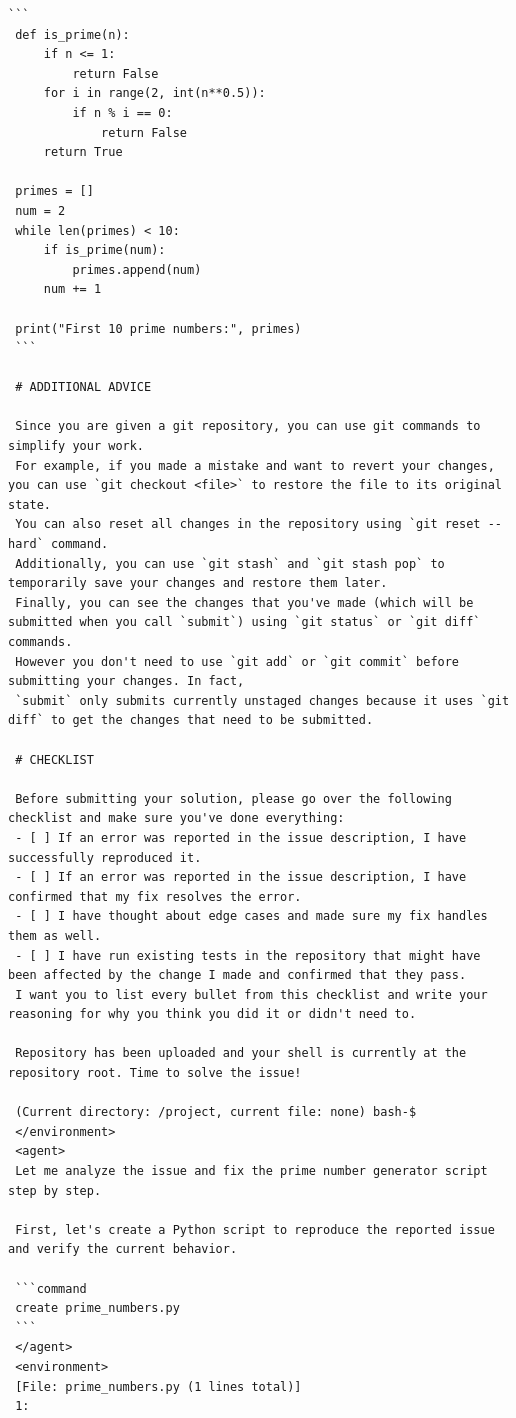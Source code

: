 \documentclass[dandb]{article}
\begin{document}
\begin{lstlisting}[upquote=true,caption=System prompt for LLM evaluation runs on SWE-rebench leaderboard tasks]
 ```
 def is_prime(n):
     if n <= 1:
         return False
     for i in range(2, int(n**0.5)):
         if n % i == 0:
             return False
     return True

 primes = []
 num = 2
 while len(primes) < 10:
     if is_prime(num):
         primes.append(num)
     num += 1

 print("First 10 prime numbers:", primes)
 ```

 # ADDITIONAL ADVICE

 Since you are given a git repository, you can use git commands to simplify your work.
 For example, if you made a mistake and want to revert your changes, you can use `git checkout <file>` to restore the file to its original state.
 You can also reset all changes in the repository using `git reset --hard` command.
 Additionally, you can use `git stash` and `git stash pop` to temporarily save your changes and restore them later.
 Finally, you can see the changes that you've made (which will be submitted when you call `submit`) using `git status` or `git diff` commands.
 However you don't need to use `git add` or `git commit` before submitting your changes. In fact,
 `submit` only submits currently unstaged changes because it uses `git diff` to get the changes that need to be submitted.

 # CHECKLIST

 Before submitting your solution, please go over the following checklist and make sure you've done everything:
 - [ ] If an error was reported in the issue description, I have successfully reproduced it.
 - [ ] If an error was reported in the issue description, I have confirmed that my fix resolves the error.
 - [ ] I have thought about edge cases and made sure my fix handles them as well.
 - [ ] I have run existing tests in the repository that might have been affected by the change I made and confirmed that they pass.
 I want you to list every bullet from this checklist and write your reasoning for why you think you did it or didn't need to.

 Repository has been uploaded and your shell is currently at the repository root. Time to solve the issue!

 (Current directory: /project, current file: none) bash-$
 </environment>
 <agent>
 Let me analyze the issue and fix the prime number generator script step by step.

 First, let's create a Python script to reproduce the reported issue and verify the current behavior.

 ```command
 create prime_numbers.py
 ```
 </agent>
 <environment>
 [File: prime_numbers.py (1 lines total)]
 1:


\end{lstlisting}
\end{document}
